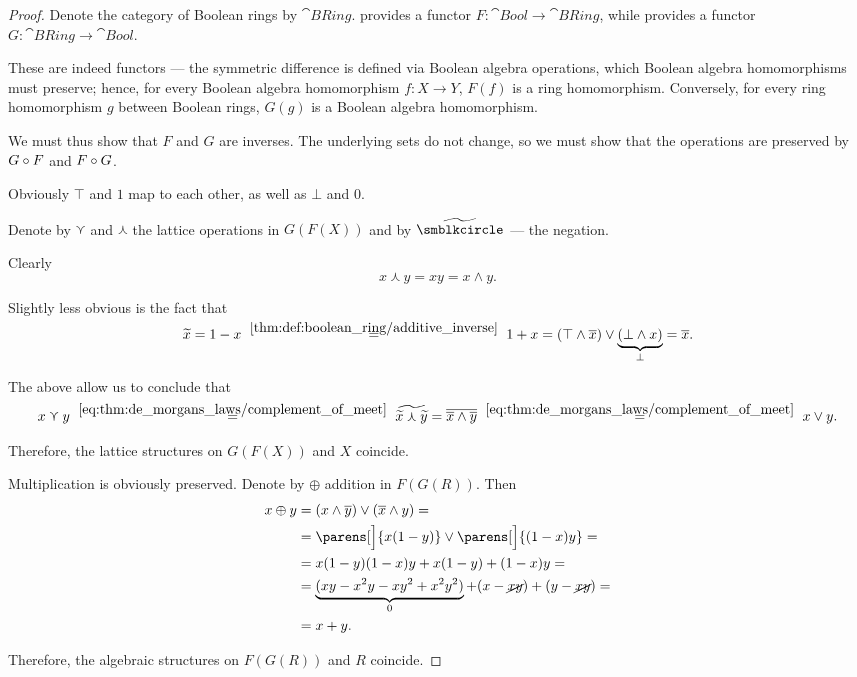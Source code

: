 \begin{proof}
  Denote the category of Boolean rings by \( \cat{BRing} \).  provides a functor \( F: \cat{Bool} \to \cat{BRing} \), while  provides a functor \( G: \cat{BRing} \to \cat{Bool} \).

  These are indeed functors --- the symmetric difference is defined via Boolean algebra operations, which Boolean algebra homomorphisms must preserve; hence, for every Boolean algebra homomorphism \( f: X \to Y \), \( F(f) \) is a ring homomorphism. Conversely, for every ring homomorphism \( g \) between Boolean rings, \( G(g) \) is a Boolean algebra homomorphism.

  We must thus show that \( F \) and \( G \) are inverses. The underlying sets do not change, so we must show that the operations are preserved by \( G \bincirc F \) and \( F \bincirc G \).

   Obviously \( \top \) and \( 1 \) map to each other, as well as \( \bot \) and \( 0 \).

  Denote by \( \curlyvee \) and \( \curlywedge \) the lattice operations in \( G(F(X)) \) and by \( \widetilde{\anon} \) --- the negation.

  Clearly
  \begin{equation*}
    x \curlywedge y = xy = x \wedge y.
  \end{equation*}

  Slightly less obvious is the fact that
  \begin{equation*}
    \widetilde{x}
    =
    1 - x
    \reloset {\ref{thm:def:boolean_ring/additive_inverse}}
    =
    1 + x
    =
    (\top \wedge \oline{x}) \vee \underbrace{(\bot \wedge x)}_\bot
    =
    \oline{x}.
  \end{equation*}

  The above allow us to conclude that
  \begin{equation*}
    x \curlyvee y
    \reloset {\eqref{eq:thm:de_morgans_laws/complement_of_meet}} =
    \widetilde{ \widetilde x \curlywedge \widetilde y }
    =
    \oline{ \oline x \wedge \oline y }
    \reloset {\eqref{eq:thm:de_morgans_laws/complement_of_meet}} =
    x \vee y.
  \end{equation*}

  Therefore, the lattice structures on \( G(F(X)) \) and \( X \) coincide.

   Multiplication is obviously preserved. Denote by \( \oplus \) addition in \( F(G(R)) \). Then
  \begin{align*}
    x \oplus y
    &=
    (x \wedge \oline y) \vee (\oline x \wedge y)
    = \\ &=
    \parens[\Big]{ x (1 - y) } \vee \parens[\Big]{ (1 - x) y }
    = \\ &=
    x (1 - y) (1 - x) y + x (1 - y) + (1 - x) y
    = \\ &=
    \underbrace{(xy - x^2y - x y^2 + x^2 y^2)}_0 + (x - \cancel{xy}) + (y - \cancel{xy})
    = \\ &=
    x + y.
  \end{align*}

  Therefore, the algebraic structures on \( F(G(R)) \) and \( R \) coincide.
\end{proof}
